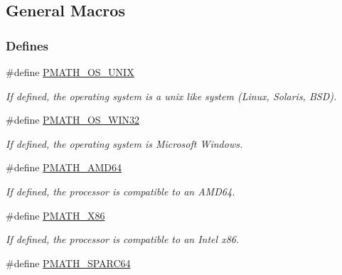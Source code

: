 \hypertarget{group__macros}{
\subsection{General Macros}
\label{group__macros}
}
\subsubsection*{Defines}
\begin{CompactItemize}
\item 
\hypertarget{group__macros_gfebd74af77a966c832743f652ac60de4}{
\#define \hyperlink{group__macros_gfebd74af77a966c832743f652ac60de4}{PMATH\_\-OS\_\-UNIX}}
\label{group__macros_gfebd74af77a966c832743f652ac60de4}

\begin{CompactList}\small\item\em If defined, the operating system is a unix like system (Linux, Solaris, BSD). \item\end{CompactList}\item 
\hypertarget{group__macros_gb17fc3cb59a43f02fb8255d008999531}{
\#define \hyperlink{group__macros_gb17fc3cb59a43f02fb8255d008999531}{PMATH\_\-OS\_\-WIN32}}
\label{group__macros_gb17fc3cb59a43f02fb8255d008999531}

\begin{CompactList}\small\item\em If defined, the operating system is Microsoft Windows. \item\end{CompactList}\item 
\hypertarget{group__macros_gb3cd76a755b22fcd371bc4eb673d7e85}{
\#define \hyperlink{group__macros_gb3cd76a755b22fcd371bc4eb673d7e85}{PMATH\_\-AMD64}}
\label{group__macros_gb3cd76a755b22fcd371bc4eb673d7e85}

\begin{CompactList}\small\item\em If defined, the processor is compatible to an AMD64. \item\end{CompactList}\item 
\hypertarget{group__macros_gd3b552830e3b4164a75069572b2c4fac}{
\#define \hyperlink{group__macros_gd3b552830e3b4164a75069572b2c4fac}{PMATH\_\-X86}}
\label{group__macros_gd3b552830e3b4164a75069572b2c4fac}

\begin{CompactList}\small\item\em If defined, the processor is compatible to an Intel x86. \item\end{CompactList}\item 
\hypertarget{group__macros_g0a03c7700780476e25bc9990a3ef3656}{
\#define \hyperlink{group__macros_g0a03c7700780476e25bc9990a3ef3656}{PMATH\_\-SPARC64}}
\label{group__macros_g0a03c7700780476e25bc9990a3ef3656}


\end{CompactItemize}
